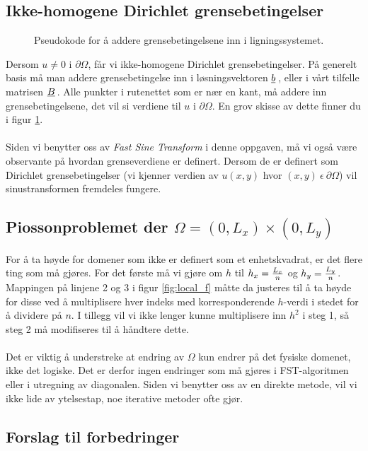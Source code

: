 \documentclass{article}
\newcommand{\ub}[1]{\underbar{$#1$}\,}
\begin{document}
\subsection{Ikke-homogene Dirichlet grensebetingelser}
\begin{figure}[h]
	\centering
	
	\caption{Pseudokode for å addere grensebetingelsene inn i ligningssystemet.}
	\label{fig:non_homogenous_dirichlet}
\end{figure}
Dersom $u \neq 0$ i $\partial\Omega$, får vi ikke-homogene Dirichlet grensebetingelser. På generelt basis må man addere grensebetingelse inn i løsningsvektoren $\ub{b}$, eller i vårt tilfelle matrisen $\ub{B}$. Alle punkter i rutenettet som er nær en kant, må addere inn grensebetingelsene, det vil si verdiene til $u$ i $\partial\Omega$. En grov skisse av dette finner du i figur \ref{fig:non_homogenous_dirichlet}. \\
\\
Siden vi benytter oss av \emph{Fast Sine Transform} i denne oppgaven, må vi også være observante på hvordan grenseverdiene er definert. Dersom de er definert som Dirichlet grensebetingelser (vi kjenner verdien av $u(x, y)$ hvor $(x, y)\ \epsilon\ \partial\Omega$) vil sinustransformen fremdeles fungere.\\

\subsection{Piossonproblemet der $\Omega = (0, L_x) \times (0, L_y)$}
For å ta høyde for domener som ikke er definert som et enhetskvadrat, er det flere ting som må gjøres. For det første må vi gjøre om $h$ til $h_x = {L_x \over n}$ og $h_y = {L_y \over n}$. Mappingen på linjene 2 og 3 i figur \ref{fig:local_f} måtte da justeres til å ta høyde for disse ved å multiplisere hver indeks med korresponderende $h$-verdi i stedet for å dividere på $n$. I tillegg vil vi ikke lenger kunne multiplisere inn $h^2$ i steg 1, så steg 2 må modifiseres til å håndtere dette.\\
\\
Det er viktig å understreke at endring av $\Omega$ kun endrer på det fysiske domenet, ikke det logiske. Det er derfor ingen endringer som må gjøres i FST-algoritmen eller i utregning av diagonalen. Siden vi benytter oss av en direkte metode, vil vi ikke lide av ytelsestap, noe iterative metoder ofte gjør.
\subsection{Forslag til forbedringer}


\end{document}
